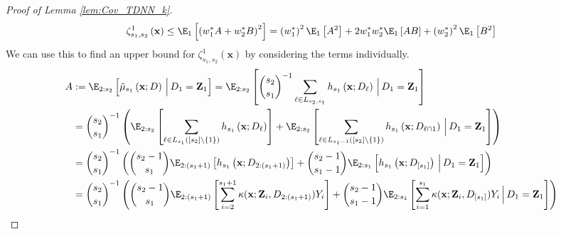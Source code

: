 \begin{proof}[Proof of Lemma \ref{lem:Cov_TDNN_k}]
\begin{equation}
		\zeta_{s_1, s_2}^{1}\left(\mathbf{x}\right)
		\leq \E_{1}\left[\left(w_{1}^{*} A	+ w_{2}^{*} B\right)^{2}\right]
		= \left(w_{1}^{*}\right)^2 \E_{1}\left[A^2\right]
		+ 2 w_{1}^{*}w_{2}^{*} \E_{1}\left[AB\right]
		+ \left(w_{2}^{*}\right)^2 \E_{1}\left[B^2\right]
	\end{equation}
	We can use this to find an upper bound for $\zeta_{s_1, s_2}^{1}\left(\mathbf{x}\right)$ by considering the terms individually.
	\begin{equation}
		\begin{aligned}
			A
			 & := \E_{2:s_2}\left[\tilde{\mu}_{s_1}\left(\mathbf{x}; D\right)\, \Big| \, D_1 = \mathbf{Z}_1\right]
			= \E_{2:s_2}\left[
			\binom{s_2}{s_1}^{-1}\sum_{\ell \in L_{s_2, s_1}}h_{s_1}\left(\mathbf{x}; D_{\ell}\right)\, \Big| \, D_1 = \mathbf{Z}_1
			\right]                                                                                                                                                                     \\
			 & = \binom{s_2}{s_1}^{-1}\left(\E_{2:s_2}\left[
				\sum_{\ell \in L_{s_1}\left([s_2] \backslash \{1\}\right)}h_{s_1}\left(\mathbf{x}; D_{\ell}\right)\right]
			+ \E_{2:s_2}\left[
				\sum_{\ell \in L_{s_1 - 1}\left([s_2] \backslash \{1\}\right)}h_{s_1}\left(\mathbf{x}; D_{\ell \cap 1}\right)\, \Big| \, D_1 = \mathbf{Z}_1\right]
			\right)                                                                                                                                                                     \\
			 & = \binom{s_2}{s_1}^{-1}\left(
			\binom{s_2 - 1}{s_1}\E_{2:(s_1 + 1)}\left[h_{s_1}\left(\mathbf{x}; D_{2:(s_1 + 1)}\right)\right]
			+ \binom{s_2 - 1}{s_1 - 1}\E_{2:s_1}\left[h_{s_1}\left(\mathbf{x}; D_{[s_1]}\right)\, \Big| \, D_1 = \mathbf{Z}_1\right]
			\right)                                                                                                                                                                     \\
			 & = \binom{s_2}{s_1}^{-1}\left(
			\binom{s_2 - 1}{s_1}\E_{2:(s_1 + 1)}\left[\sum_{i = 2}^{s_1 + 1}\kappa(\mathbf{x}; \mathbf{Z}_i, D_{2:(s_1 + 1)}) Y_i\right]
			+ \binom{s_2 - 1}{s_1 - 1}\E_{2:s_1}\left[\sum_{i = 1}^{s_1}\kappa(\mathbf{x}; \mathbf{Z}_i, D_{[s_1]}) Y_i\, \Big| \, D_1 = \mathbf{Z}_1\right]
			\right)                                                                                                                                                                     \\

\end{aligned}
\end{equation}
\end{proof}
